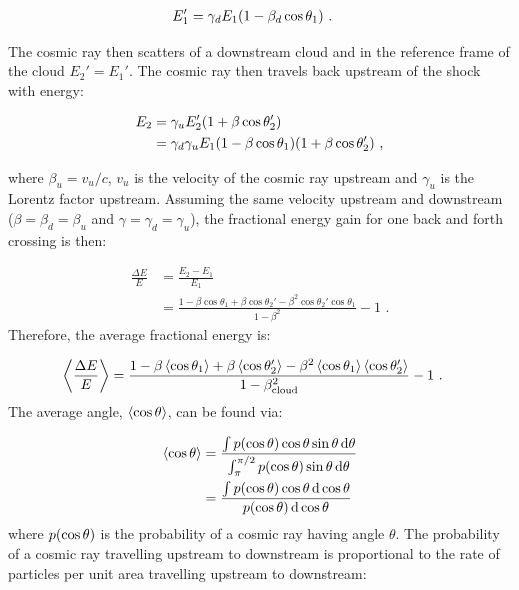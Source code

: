 \begin{equation}
    \begin{aligned}
        E_1'&=\gamma_d E_1\qty(1-\beta_d \cos\theta_1)\text{ .}
    \end{aligned}
\end{equation}

\noindent The cosmic ray then scatters of a downstream cloud and in the reference frame of the cloud $E_2'=E_1'$. The cosmic ray then travels back upstream of the shock with energy:

\begin{equation}
    \begin{aligned}
        E_2&=\gamma_u E_2'\qty(1+\beta\cos\theta_2') \\
        &=\gamma_d\gamma_u E_1 \qty(1-\beta \cos\theta_1)\qty(1+\beta\cos\theta_2')\text{ ,}
    \end{aligned}
\end{equation}

\noindent where $\beta_u=v_u/c$, $v_u$ is the velocity of the cosmic ray upstream and $\gamma_u$ is the Lorentz factor upstream. Assuming the same velocity upstream and downstream ($\beta=\beta_d=\beta_u$ and $\gamma=\gamma_d=\gamma_u$), the fractional energy gain for one back and forth crossing is then:

\begin{equation}
    \begin{aligned}
    \frac{\Delta E}{E}&=\frac{E_2-E_1}{E_1} \\
&=\frac{1-\beta\cos\theta_1+\beta\cos\theta_2'-\beta^2\cos\theta_2'\cos\theta_1}{1-\beta^2}-1\text{ .}
    \end{aligned} 
\end{equation}
\noindent Therefore, the average fractional energy is:

\begin{equation}
    \begin{aligned}
    \left\langle \frac{\Delta E}{E} \right\rangle
	&=\frac{1-\beta\left\langle \cos\theta_1 \right\rangle+\beta\left\langle \cos\theta_2' \right\rangle-\beta^2\left\langle \cos\theta_1 \right\rangle\left\langle \cos\theta_2' \right\rangle}{1-\beta_\text{cloud}^2}-1\text{ .}
    \end{aligned} 
\end{equation}
\noindent The average angle, $\left\langle \cos\theta \right\rangle$, can be found via:

\begin{equation}
    \begin{aligned}
        \left\langle \cos\theta \right\rangle&=\frac{\int p\qty(\cos\theta)\cos\theta\sin\theta \dd{\theta}}{\int_\pi^{\pi/2}p\qty(\cos\theta)\sin\theta \dd{\theta}} \\
        &=\frac{\int p\qty(\cos\theta)\cos\theta\dd{\cos\theta}}{p\qty(\cos\theta) \dd{\cos\theta}}
    \end{aligned}
\end{equation}
\noindent where $p\qty(\cos\theta)$ is the probability of a cosmic ray having angle $\theta$. The probability of a cosmic ray travelling upstream to downstream is proportional to the rate of particles per unit area travelling upstream to downstream:

